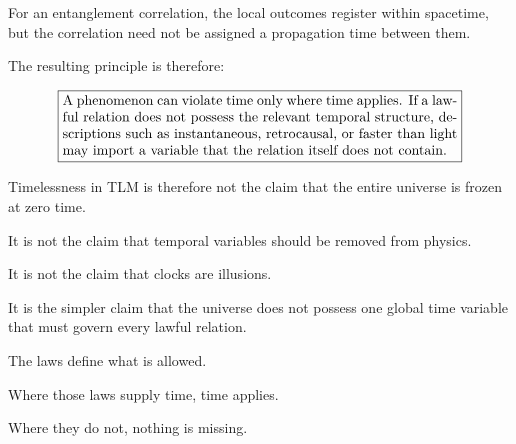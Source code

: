 \documentclass[12pt,onecolumn]{article}
\theoremstyle{plain}
\theoremstyle{definition}
\theoremstyle{remark}
\begin{document}
For an entanglement correlation, the local outcomes register within
spacetime, but the correlation need not be assigned a propagation time
between them.

The resulting principle is therefore:

\[
\boxed{
\begin{minipage}{0.82\linewidth}
A phenomenon can violate time only where time applies. If a lawful relation
does not possess the relevant temporal structure, descriptions such as
instantaneous, retrocausal, or faster than light may import a variable that
the relation itself does not contain.
\end{minipage}
}
\]

Timelessness in TLM is therefore not the claim that the entire universe is
frozen at zero time.

It is not the claim that temporal variables should be removed from physics.

It is not the claim that clocks are illusions.

It is the simpler claim that the universe does not possess one global time
variable that must govern every lawful relation.

The laws define what is allowed.

Where those laws supply time, time applies.

Where they do not, nothing is missing.
\end{document}
